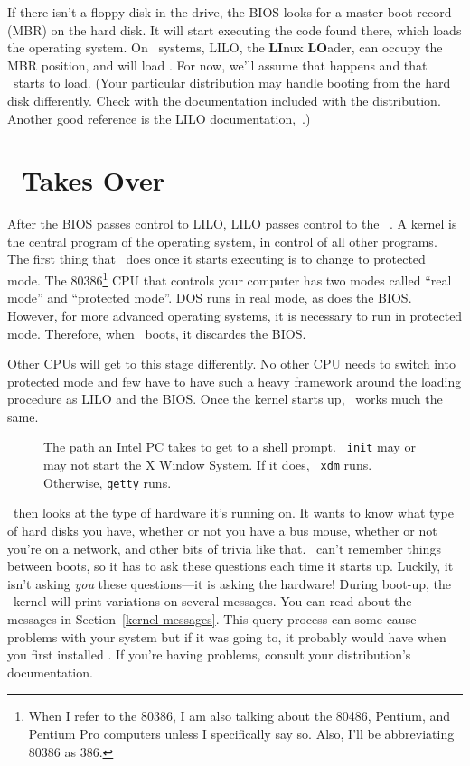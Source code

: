 If there isn't a floppy disk in the drive, the BIOS looks
for a master boot record
 (MBR) on the hard disk.  It will start
executing the code found there, which loads the operating system.  On
\linux\ systems, LILO, the {\bf LI}nux {\bf LO}ader, can
occupy the MBR position, and will load \linux.  For now, we'll assume
that happens and that \linux\ starts to load. (Your particular
distribution may handle booting from the hard disk differently.  Check
with the documentation included with the distribution. Another good
reference is the LILO documentation,~\cite{Al:LILO}.)

\section{\linux\ Takes Over}\label{linux-powerup}

After the BIOS passes control to LILO, LILO
passes control to the \linux\ .  A kernel is the
central program of the operating system, in control of all other
programs.  The first thing that \linux\ does once it starts executing
is to change to protected mode. The
80386\footnote{When I refer to the 80386, I am also talking about the
  80486, Pentium, and Pentium Pro computers unless I specifically say
  so.  Also, I'll be abbreviating 80386 as 386.} CPU that controls
your computer has two modes called ``real mode''
and ``protected mode''.  DOS runs in real mode, as does the
BIOS. However, for more advanced operating systems, it is
necessary to run in protected mode.  Therefore, when \linux\ boots, it
discardes the BIOS.

Other CPUs will get to this stage differently.  No other CPU needs to
switch into protected mode and few have to have such a heavy framework
around the loading procedure as LILO and the BIOS.  Once the kernel
starts up, \linux\ works much the same.

\begin{figure}[tb]\label{bootup-figure}
\centering
{}
\caption{The path an Intel PC takes to get to a shell prompt. {\tt
    init} may or may not start the X Window System.  If it does, {\tt
    xdm} runs.  Otherwise, {\tt getty} runs.}
\end{figure}

\linux\ then looks at the type of hardware it's running on.  It wants
to know what type of hard disks you have, whether or not you have a
bus mouse, whether or not you're on a network, and other bits of
trivia like that.  \linux\ can't remember things between boots, so it
has to ask these questions each time it starts up.  Luckily, it isn't
asking {\em you\/} these questions---it is asking the hardware!
During boot-up, the \linux\ kernel will print variations on several
messages. You can read about the messages in
Section~\ref{kernel-messages}.  This query process can some cause
problems with your system but if it was going to, it probably would
have when you first installed \linux.  If you're having problems,
consult your distribution's documentation.

